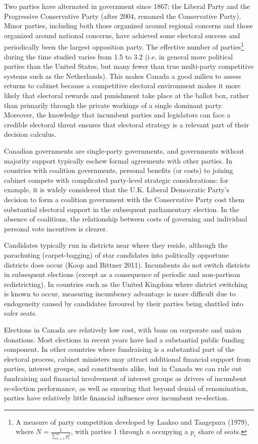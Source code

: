 \documentclass[letter,12pt]{article}
\begin{document}
Two parties have alternated in government since 1867: the Liberal Party and the Progressive Conservative Party (after 2004, renamed the Conservative Party). Minor parties, including both those organized around regional concerns and those organized around national concerns, have achieved some electoral success and periodically been the largest opposition party. The effective number of parties\footnote{A measure of party competition developed by Laakso and Taagepara (1979), where $N = \frac{1}{\sum_{i=1}^n p_i^2}$, with parties 1 through \textit{n} occupying a $p_i$ share of seats.} during the time studied varies from 1.5 to 3.2 (i.e. in general more political parties than the United States, but many fewer than true multi-party competitive systems such as the Netherlands). This makes Canada a good milieu to assess returns to cabinet because a competitive electoral environment makes it more likely that electoral rewards and punishment take place at the ballot box, rather than primarily through the private workings of a single dominant party. Moreover, the knowledge that incumbent parties and legislators can face a credible electoral threat ensures that electoral strategy is a relevant part of their decision calculus.

Canadian governments are single-party governments, and governments without majority support typically eschew formal agreements with other parties. In countries with coalition governments, personal benefits (or costs) to joining cabinet compete with complicated party-level strategic considerations: for example, it is widely considered that the U.K. Liberal Democratic Party's decision to form a coalition government with the Conservative Party cost them substantial electoral support in the subsequent parliamentary election. In the absence of coalitions, the relationship between costs of governing and individual personal vote incentives is clearer.

Candidates typically run in districts near where they reside, although the parachuting (carpet-bagging) of star candidates into politically opportune districts does occur (Koop and Bittner 2011). Incumbents do not switch districts in subsequent elections (except as a consequence of periodic and non-partisan redistricting). In countries such as the United Kingdom where district switching is known to occur, measuring incumbency advantage is more difficult due to endogeneity caused by candidates favoured by their parties being shuttled into safer seats.

Elections in Canada are relatively low cost, with bans on corporate and union donations. Most elections in recent years have had a substantial public funding component. In other countries where fundraising is a substantial part of the electoral process, cabinet ministers may attract additional financial support from parties, interest groups, and constituents alike, but in Canada we can rule out fundraising and financial involvement of interest groups as drivers of incumbent re-election performance, as well as ensuring that beyond denial of renomination, parties have relatively little financial influence over incumbent re-election.
\end{document}
